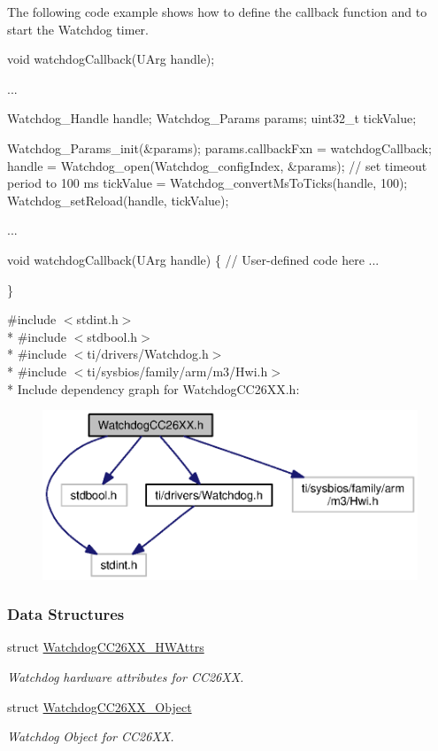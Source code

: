 The following code example shows how to define the callback function and to start the Watchdog timer. 
\begin{DoxyCode}
\textcolor{keywordtype}{void} watchdogCallback(UArg handle);

...

Watchdog\_Handle handle;
Watchdog_Params params;
uint32\_t tickValue;

Watchdog_Params_init(&params);
params.callbackFxn = watchdogCallback;
handle = Watchdog_open(Watchdog\_configIndex, &params);
\textcolor{comment}{// set timeout period to 100 ms}
tickValue = Watchdog_convertMsToTicks(handle, 100);
Watchdog_setReload(handle, tickValue);

...

void watchdogCallback(UArg handle)
\{
    \textcolor{comment}{// User-defined code here}
    ...

\}
\end{DoxyCode}
 {\ttfamily \#include $<$stdint.\+h$>$}\\*
{\ttfamily \#include $<$stdbool.\+h$>$}\\*
{\ttfamily \#include $<$ti/drivers/\+Watchdog.\+h$>$}\\*
{\ttfamily \#include $<$ti/sysbios/family/arm/m3/\+Hwi.\+h$>$}\\*
Include dependency graph for Watchdog\+C\+C26\+X\+X.\+h\+:
\nopagebreak
\begin{figure}[H]
\begin{center}
\leavevmode
\includegraphics[width=350pt]{_watchdog_c_c26_x_x_8h__incl}
\end{center}
\end{figure}
\subsubsection*{Data Structures}
\begin{DoxyCompactItemize}
\item 
struct \hyperlink{struct_watchdog_c_c26_x_x___h_w_attrs}{Watchdog\+C\+C26\+X\+X\+\_\+\+H\+W\+Attrs}
\begin{DoxyCompactList}\small\item\em Watchdog hardware attributes for C\+C26\+X\+X. \end{DoxyCompactList}\item 
struct \hyperlink{struct_watchdog_c_c26_x_x___object}{Watchdog\+C\+C26\+X\+X\+\_\+\+Object}
\begin{DoxyCompactList}\small\item\em Watchdog Object for C\+C26\+X\+X. \end{DoxyCompactList}\end{DoxyCompactItemize}
